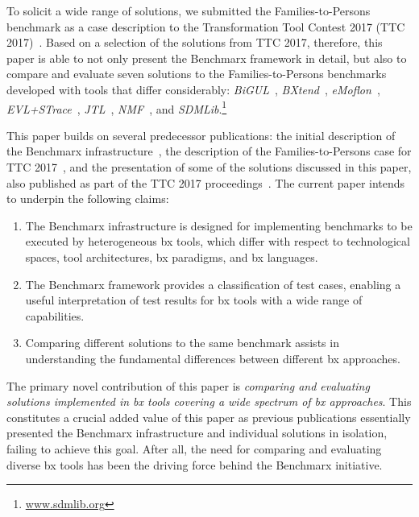 To solicit a wide range of solutions, we submitted the Families-to-Persons benchmark as a case description to the Transformation Tool Contest 2017 (TTC 2017)~\cite{Anjorin2017a}.
Based on a selection of the solutions from TTC 2017, therefore, this paper is able to not only present the Benchmarx framework in detail, but also to compare and evaluate seven solutions to the Families-to-Persons benchmarks developed with tools that differ considerably: 
\emph{BiGUL}~\cite{PEPM2016-Ko}, 
\emph{BXtend}~\cite{MODELSWARD2018-Buchmann}, 
\emph{eMoflon}~\cite{Leblebici2014a}, 
\emph{EVL+STrace}~\cite{IST2018-Samimi}, 
\emph{JTL}~\cite{SLE2010-Cicchetti}, 
\emph{NMF}~\cite{SoSyM2017-Hinkel},
and 
\emph{SDMLib}.\footnote{\url{www.sdmlib.org}}

This paper builds on several predecessor publications: the initial description of the Benchmarx infrastructure~\cite{Anjorin2017}, the description of the Families-to-Persons case for TTC 2017~\cite{Anjorin2017a}, and the presentation of some of the solutions discussed in this paper, also published as part of the TTC 2017 proceedings~\cite{Hinkel2017,Samimi-Dehkordi2017,Zundorf2017}. 
%
The current paper intends to underpin the following claims:

\begin{enumerate}
	\item The Benchmarx infrastructure is designed for implementing benchmarks to be executed by heterogeneous bx tools, which differ with respect to technological spaces, tool architectures, bx paradigms, and bx languages.
	\item The Benchmarx framework provides a classification of test cases, enabling a useful interpretation of test results for bx tools with a wide range of capabilities.  
	\item Comparing different solutions to the same benchmark assists in understanding the fundamental differences between different bx approaches.
\end{enumerate}

The primary novel contribution of this paper is \emph{comparing and evaluating solutions implemented in bx tools covering a wide spectrum of bx approaches}.
This constitutes a crucial added value of this paper as previous publications essentially presented the Benchmarx infrastructure and individual solutions in isolation, failing to achieve this goal. 
After all, the need for comparing and evaluating diverse bx tools has been the driving force behind the Benchmarx initiative.


